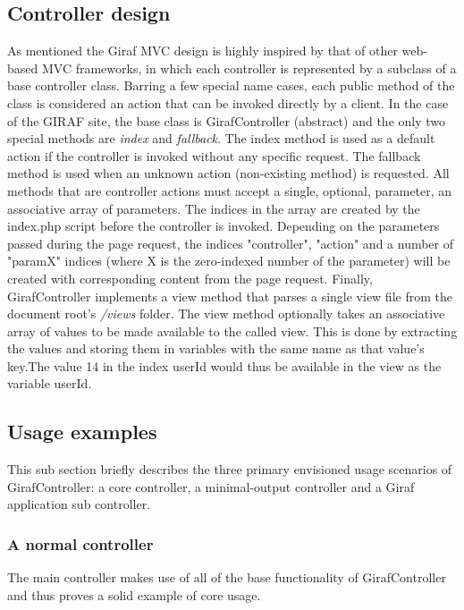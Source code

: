\subsection{Controller design}
\label{controller_design}
As mentioned the Giraf MVC design is highly inspired by that of other web-based MVC frameworks, in which each controller is represented by a subclass of a base controller class. Barring a few special name cases, each public method of the class is considered an action that can be invoked directly by a client.
In the case of the GIRAF site, the base class is GirafController (abstract) and the only two special methods are \emph{index} and \emph{fallback}. The index method is used as a default action if the controller is invoked without any specific request. The fallback method is used when an unknown action (non-existing method) is requested.
All methods that are controller actions must accept a single, optional, parameter, an associative array of parameters. The indices in the array are created by the index.php script before the controller is invoked. Depending on the parameters passed during the page request, the indices "controller", "action" and a number of "paramX" indices (where X is the zero-indexed number of the parameter) will be created with corresponding content from the page request.
Finally, GirafController implements a view method that parses a single view file from the document root's \emph{/views} folder. The view method optionally takes an associative array of values to be made available to the called view. This is done by extracting the values and storing them in variables with the same name as that value's key.The value 14 in the index userId would thus be available in the view as the variable userId.

\subsection{Usage examples}
This sub section briefly describes the three primary envisioned usage scenarios of GirafController: a core controller, a minimal-output controller and a Giraf application sub controller.

\subsubsection*{A normal controller}
The main controller makes use of all of the base functionality of GirafController and thus proves a solid example of core usage. 

